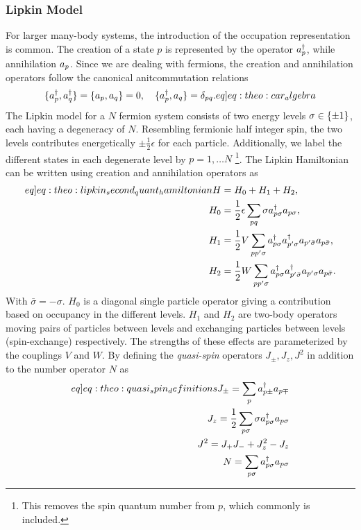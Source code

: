 \subsubsection{Lipkin Model}
For larger many-body systems, the introduction of the occupation representation is common. The creation of a state $p$ is represented by the operator $a^{\dagger}_{p}$, while annihilation $a_{p}$. Since we are dealing with fermions, the creation and annihilation operators follow the canonical anitcommutation relations
\begin{align}
    \set{\crt{p},\crt{q}} = \set{\ani{p},\ani{q}} = 0, \hspace{10px}\set{\crt{p},\ani{q}} = \delta_{pq}. 
    \label[eq]{eq:theo:car_algebra}
\end{align}
The Lipkin model \citep{lipkinValidityManybodyApproximation1965} for a $N$ fermion system consists of two energy levels $\sigma \in \{\pm 1\}$, each having a degeneracy of $N$. Resembling fermionic half integer spin, the two levels contributes energetically $\pm \frac{1}{2}\epsilon$ for each particle. Additionally, we label the different states in each degenerate level by $p = 1, \ldots N$ \footnote{This removes the spin quantum number from $p$, which commonly is included.}. The Lipkin Hamiltonian can be written using creation and annihilation operators as 
\begin{align}
    \begin{split}\label[eq]{eq:theo:lipkin_second_quant_hamiltonian}
    H &= H_0 + H_1 + H_2, \\
    H_0 &= \frac{1}{2}\epsilon \sum_{pq} \sigma \crt{p\sigma} \ani{p\sigma}, \\
    H_1 &= \frac{1}{2}V \sum_{pp'\sigma} \crt{p\sigma}\crt{p'\sigma}\ani{p'\bar{\sigma}}\ani{p\bar{\sigma}}, \\
    H_2 &= \frac{1}{2}W \sum_{pp'\sigma} \crt{p\sigma} \crt{p'\bar{\sigma}} \ani{p'\sigma} \ani{p\bar{\sigma}}.
    \end{split}
\end{align}
With $\bar{\sigma} = -\sigma$. $H_0$ is a diagonal single particle operator giving a contribution based on occupancy in the different levels. $H_1$ and $H_2$ are two-body operators moving pairs of particles between levels and exchanging particles between levels (spin-exchange) respectively. The strengths of these effects are parameterized by the couplings $V$ and $W$. By defining the \textit{quasi-spin} operators $J_\pm , J_z, J^2$ in addition to the number operator $N$ as 
\begin{align}
    \begin{split}\label[eq]{eq:theo:quasi_spin_definitions}
        J_\pm = \sum_p \crt{p\pm}\ani{p\mp} \\
        J_z = \frac{1}{2}\sum_{p\sigma} \sigma \crt{p\sigma} \ani{p\sigma} \\
        J^2 = J_+ J_- + J_z^2 - J_z \\
        N = \sum_{p\sigma} \crt{p\sigma} \ani{p\sigma}
    \end{split}
\end{align}
